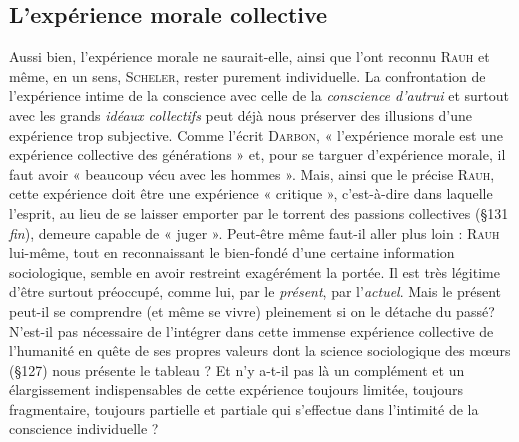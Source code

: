 \subsection{L'expérience morale collective}%
Aussi bien, l’expérience
morale ne saurait-elle, ainsi que l’ont reconnu \textsc{Rauh} et même, en un
sens, \textsc{Scheler}, rester purement individuelle. La confrontation de
l’expérience intime de la conscience avec celle de la {\it conscience d'autrui}
et surtout avec les grands {\it idéaux collectifs} peut déjà nous préserver
des illusions d’une expérience trop subjective. Comme l’écrit \textsc{Darbon},
« l'expérience morale est une expérience collective des générations » et,
pour se targuer d’expérience morale, il faut avoir « beaucoup vécu avec
les hommes ». Mais, ainsi que le précise \textsc{Rauh}, cette expérience doit
être une expérience « critique », c’est-à-dire dans laquelle l'esprit,
au lieu de se laisser emporter par le torrent des passions collectives
(\S 131 {\it fin}), demeure capable de « juger ». Peut-être même faut-il
aller plus loin : \textsc{Rauh} lui-même, tout en reconnaissant le bien-fondé
d’une certaine information sociologique, semble en avoir restreint
exagérément la portée. Il est très légitime d’être surtout préoccupé,
comme lui, par le {\it présent}, par l’{\it actuel}. Mais le présent peut-il se
comprendre (et même se vivre) pleinement si on le détache du passé?
N’est-il pas nécessaire de l’intégrer dans cette immense expérience
collective de l'humanité en quête de ses propres valeurs dont la
science sociologique des mœurs (\S 127) nous présente le tableau ?
Et n’y a-t-il pas là un complément et un élargissement indispensables
de cette expérience toujours limitée, toujours fragmentaire, toujours
partielle et partiale qui s’effectue dans l'intimité de la conscience
individuelle ?

